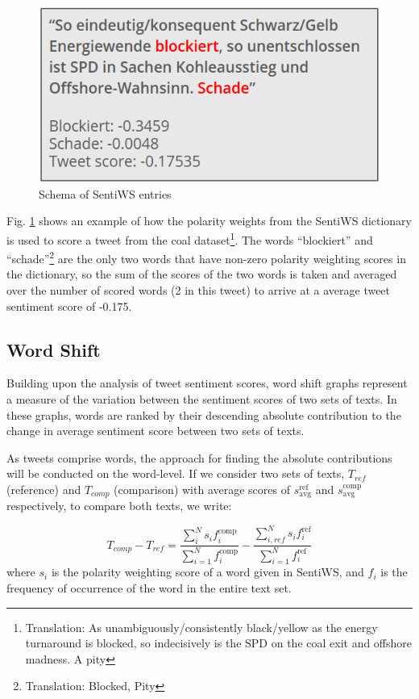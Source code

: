 \documentclass[12pt,onecolumn,twoside]{layout}
\begin{document}
\begin{figure}
	\begin{center}
		\includegraphics[width=0.5\linewidth]{figures/sentiws_example_use}
	\end{center}
	\caption{Schema of SentiWS entries}
	\label{fig:sentiws_example_use}
\end{figure}

Fig. \ref{fig:sentiws_example_use} shows an example of how the polarity weights from the SentiWS dictionary is used to score a tweet from the coal dataset\footnote{Translation: As unambiguously/consistently black/yellow as the energy turnaround is blocked, so indecisively is the SPD on the coal exit and offshore madness. A pity}. The words ``blockiert'' and ``schade''\footnote{Translation: Blocked, Pity} are the only two words that have non-zero polarity weighting scores in the dictionary, so the sum of the scores of the two words is taken and averaged over the number of scored words (2 in this tweet) to arrive at a average tweet sentiment score of -0.175.

\subsection*{Word Shift}
Building upon the analysis of tweet sentiment scores, word shift graphs represent a measure of the variation between the sentiment scores of two sets of texts. In these graphs, words are ranked by their descending absolute contribution to the change in average sentiment score between two sets of texts.

As tweets comprise words, the approach for finding the absolute contributions will be conducted on the word-level. If we consider two sets of texts, \(T_{ref}\) (reference) and \(T_{comp}\) (comparison) with average scores of \(s_{\text{avg}}^{\text{ref}}\) and \(s_{\text{avg}}^{\text{comp}}\) respectively, to compare both texts, we write:

\begin{equation}
\label{eq:text_difference}
T_{comp} - T_{ref} = \frac{\sum_{i}^{N} s_i f_i^{\text{comp}}}{\sum_{i=1}^{N} f_i^{\text{comp}}} - \frac{\sum_{i,ref}^{N} s_i f_i^{\text{ref}}}{\sum_{i=1}^{N} f_i^{\text{ref}}}
\end{equation}
where \(s_i\) is the polarity weighting score of a word given in SentiWS, and \(f_i\) is the frequency of occurrence of the word in the entire text set.
\end{document}
